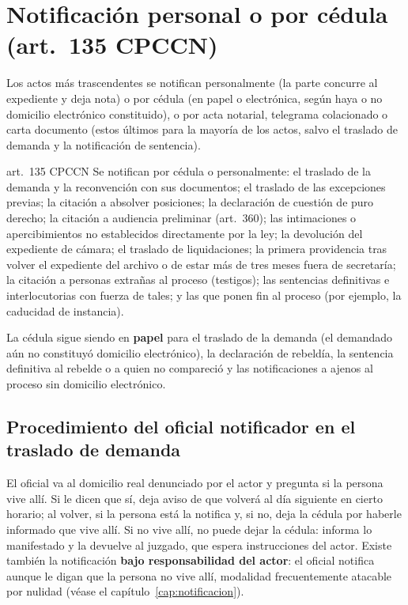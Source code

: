 \documentclass[12pt,oneside]{book}
\begin{document}
\section{Notificación personal o por cédula (art.~135 CPCCN)}

Los actos más trascendentes se notifican personalmente (la parte concurre al expediente y deja nota) o por cédula (en papel o electrónica, según haya o no domicilio electrónico constituido), o por acta notarial, telegrama colacionado o carta documento (estos últimos para la mayoría de los actos, salvo el traslado de demanda y la notificación de sentencia).

\begin{regla}{art.~135 CPCCN}
Se notifican por cédula o personalmente: el traslado de la demanda y la reconvención con sus documentos; el traslado de las excepciones previas; la citación a absolver posiciones; la declaración de cuestión de puro derecho; la citación a audiencia preliminar (art.~360); las intimaciones o apercibimientos no establecidos directamente por la ley; la devolución del expediente de cámara; el traslado de liquidaciones; la primera providencia tras volver el expediente del archivo o de estar más de tres meses fuera de secretaría; la citación a personas extrañas al proceso (testigos); las sentencias definitivas e interlocutorias con fuerza de tales; y las que ponen fin al proceso (por ejemplo, la caducidad de instancia).
\end{regla}

La cédula sigue siendo en \textbf{papel} para el traslado de la demanda (el demandado aún no constituyó domicilio electrónico), la declaración de rebeldía, la sentencia definitiva al rebelde o a quien no compareció y las notificaciones a ajenos al proceso sin domicilio electrónico.

\subsection{Procedimiento del oficial notificador en el traslado de demanda}

El oficial va al domicilio real denunciado por el actor y pregunta si la persona vive allí. Si le dicen que sí, deja aviso de que volverá al día siguiente en cierto horario; al volver, si la persona está la notifica y, si no, deja la cédula por haberle informado que vive allí. Si no vive allí, no puede dejar la cédula: informa lo manifestado y la devuelve al juzgado, que espera instrucciones del actor. Existe también la notificación \textbf{bajo responsabilidad del actor}: el oficial notifica aunque le digan que la persona no vive allí, modalidad frecuentemente atacable por nulidad (véase el capítulo~\ref{cap:notificacion}).
\end{document}
